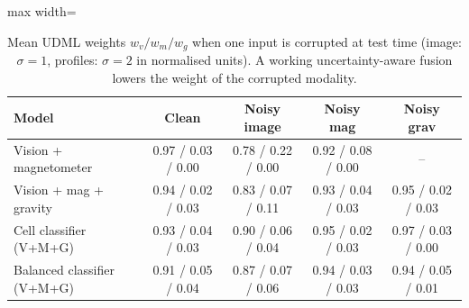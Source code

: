 \begin{table}[t]
\centering
\small
\caption{Mean UDML weights $w_v / w_m / w_g$ when one input is corrupted at test time (image: $\sigma=1$, profiles: $\sigma=2$ in normalised units). A working uncertainty-aware fusion lowers the weight of the corrupted modality.}
\label{tab:udml}
\begin{adjustbox}{max width=\linewidth}
\begin{tabular}{lcccc}
\toprule
Model & Clean & Noisy image & Noisy mag & Noisy grav \\
\midrule
Vision + magnetometer & 0.97 / 0.03 / 0.00 & 0.78 / 0.22 / 0.00 & 0.92 / 0.08 / 0.00 & -- \\
Vision + mag + gravity & 0.94 / 0.02 / 0.03 & 0.83 / 0.07 / 0.11 & 0.93 / 0.04 / 0.03 & 0.95 / 0.02 / 0.03 \\
Cell classifier (V+M+G) & 0.93 / 0.04 / 0.03 & 0.90 / 0.06 / 0.04 & 0.95 / 0.02 / 0.03 & 0.97 / 0.03 / 0.00 \\
Balanced classifier (V+M+G) & 0.91 / 0.05 / 0.04 & 0.87 / 0.07 / 0.06 & 0.94 / 0.03 / 0.03 & 0.94 / 0.05 / 0.01 \\
\bottomrule
\end{tabular}
\end{adjustbox}
\end{table}
